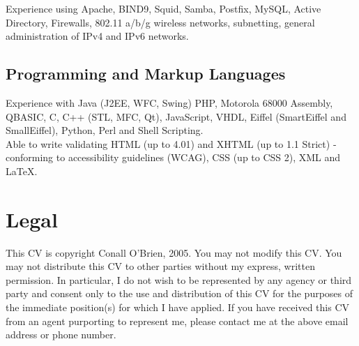 \documentclass[a4paper, 11pt] {article}
\begin{document}
Experience using Apache, BIND9, Squid, Samba, Postfix, MySQL, Active 
Directory, Firewalls, 802.11 a/b/g wireless networks, subnetting, general
administration of IPv4 and IPv6 networks. 

\subsection*{Programming and Markup Languages}

Experience with Java (J2EE, WFC, Swing) PHP, Motorola 68000 Assembly, QBASIC,
C, C++ (STL, MFC, Qt), JavaScript, VHDL, Eiffel (SmartEiffel and 
SmallEiffel), Python, Perl and Shell Scripting. \\

Able to write validating HTML (up to 4.01) and XHTML (up 
to 1.1 Strict) - conforming to accessibility guidelines (WCAG), CSS (up to 
CSS 2), XML and LaTeX.

\section*{Legal}

This CV is copyright Conall O'Brien, 2005. You may not modify this
CV. You may not distribute this CV to other parties without my express,
written permission. In particular, I do not wish to be represented by
any agency or third party and consent only to the use and distribution
of this CV for the purposes of the immediate position(s) for which I
have applied. If you have received this CV from an agent purporting to
represent me, please contact me at the above email address or phone
number.
\end{document}
